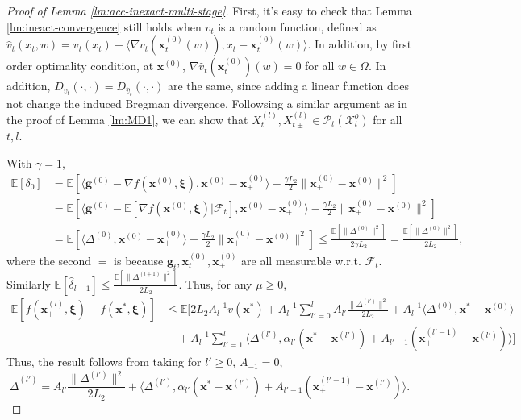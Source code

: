 \documentclass[11pt,fullpage,letterpaper]{article}
\newcommand{\mc}{\mathcal}
\newcommand{\mb}{\mathbf}
\newcommand{\E}{\mathbb{E}}
\newcommand{\bx}{\boldsymbol{\xi}}
\begin{document}
\begin{proof}[Proof of Lemma \ref{lm:acc-inexact-multi-stage}]

First, it's easy to check that Lemma \ref{lm:ineact-convergence} still holds when $v_t$ is a random function, defined as $\widehat{v}_t(x_t,w) = v_t(x_t) - \langle \nabla v_t(\mb x_t^{(0)}(w)),x_t-\mb x_t^{(0)}(w)\rangle$. In addition, by first order optimality condition, at $\mb x^{(0)}$, $\nabla \widehat{v}_t(\mb x_t^{(0)})(w) = 0$ for all $w\in \Omega$. In addition, $D_{v_t}(\cdot,\cdot) = D_{\widehat{v}_t}(\cdot,\cdot)$ are the same, since adding a linear function does not change the induced Bregman divergence. Followsing a similar argument as in the proof of Lemma \ref{lm:MD1}, we can show that $X_t^{(l)}, X_{t\pm}^{(l)}\in \mc P_t(\mc X_t^o)$ for all $t,l$.



With $\gamma=1$,
\begin{align*}
    \E[\delta_0] &= \E[\langle \mb g^{(0)} - \nabla f(\mb x^{(0)},\bx),\mb x^{(0)}-\mb x_+^{(0)}\rangle- \frac{\gamma L_2}{2}\|\mb x_+^{(0)}- \mb x^{(0)}\|^2]\\
    &=\E[\langle \mb g^{(0)} - \E[\nabla f(\mb x^{(0)},\bx)|\mc F_t],\mb x^{(0)}-\mb x_+^{(0)}\rangle - \frac{\gamma L_2}{2}\|\mb x_+^{(0)}- \mb x^{(0)}\|^2]\\
    &= \E[\langle \Delta^{(0)},\mb x^{(0)}-\mb x_+^{(0)}\rangle - \frac{\gamma L_2}{2}\|\mb x_+^{(0)}- \mb x^{(0)}\|^2]\leq \frac{\E[\|\Delta^{(0)}\|^2]}{2\gamma L_2} = \frac{\E[\|\Delta^{(0)}\|^2]}{2 L_2},
\end{align*}
where the second $=$ is because $\mb g_t,\mb x_t^{(0)}, \mb x_+^{(0)}$ are all measurable w.r.t. $\mc F_t$. Similarly $\E[\hat{\delta}_{l+1}] \leq \frac{\E[\|\Delta^{(l+1)}\|^2]}{2 L_2}$. Thus, for any $\mu\geq 0$, 
\begin{align*}
    \E[f(\mb x_+^{(l)},\bx)-f(\mb x^*,\bx)]&\leq  \E[2L_2A_l^{-1}v(\mb x^*) +  A_l^{-1}\sum_{l'=0}^l A_{l'}\frac{\|\Delta^{(l')}\|^2}{2 L_2}+A_l^{-1} \langle\Delta^{(0)},\mb x^*-\mb x^{(0)}\rangle\nonumber\\
    & \quad + A_l^{-1}\sum_{l'=1}^l \langle \Delta^{(l')},\alpha_{l'}(\mb x^*-\mb x^{(l')}) + A_{l'-1}(\mb x_+^{(l'-1)}-\mb x^{(l')})\rangle ]
\end{align*}
Thus, the result follows from taking for $l'\geq 0$, $A_{-1} = 0$, 
\begin{displaymath}
    \overline{\Delta}^{(l')} =A_{l'}\frac{\|\Delta^{(l')}\|^2}{2 L_2} +  \langle \Delta^{(l')},\alpha_{l'}(\mb x^*-\mb x^{(l')}) + A_{l'-1}(\mb x_+^{(l'-1)}-\mb x^{(l')})\rangle.
\end{displaymath}



\end{proof}
\end{document}
